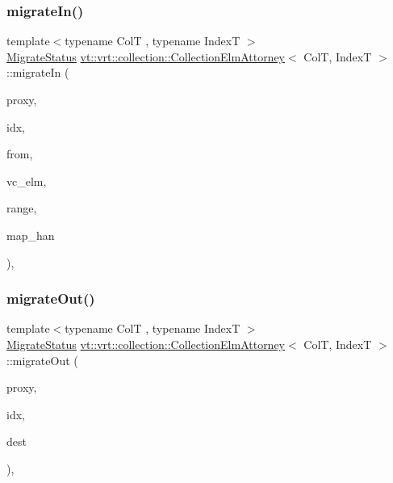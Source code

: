 \subsubsection{\texorpdfstring{migrate\+In()}{migrateIn()}}
{\footnotesize\ttfamily template$<$typename ColT , typename IndexT $>$ \\
\hyperlink{namespacevt_1_1vrt_1_1collection_ad221ad8aea9e586689b4335f5bcd9804}{Migrate\+Status} \hyperlink{structvt_1_1vrt_1_1collection_1_1_collection_elm_attorney}{vt\+::vrt\+::collection\+::\+Collection\+Elm\+Attorney}$<$ ColT, IndexT $>$\+::migrate\+In (\begin{DoxyParamCaption}\item[{\hyperlink{namespacevt_a1b417dd5d684f045bb58a0ede70045ac}{Virtual\+Proxy\+Type} const \&}]{proxy,  }\item[{IndexT const \&}]{idx,  }\item[{\hyperlink{namespacevt_a866da9d0efc19c0a1ce79e9e492f47e2}{Node\+Type} const \&}]{from,  }\item[{\hyperlink{structvt_1_1vrt_1_1collection_1_1_collection_elm_attorney_a36fe2c7f590baec1038c592db59a6315}{Virtual\+Ptr\+Type}}]{vc\+\_\+elm,  }\item[{IndexT const \&}]{range,  }\item[{\hyperlink{namespacevt_af64846b57dfcaf104da3ef6967917573}{Handler\+Type} const \&}]{map\+\_\+han }\end{DoxyParamCaption})\hspace{0.3cm}{\ttfamily [static]}, {\ttfamily [private]}}

\mbox{\label{structvt_1_1vrt_1_1collection_1_1_collection_elm_attorney_a672eb9e913410235692033f5b7ea24b5}} 
\subsubsection{\texorpdfstring{migrate\+Out()}{migrateOut()}}
{\footnotesize\ttfamily template$<$typename ColT , typename IndexT $>$ \\
\hyperlink{namespacevt_1_1vrt_1_1collection_ad221ad8aea9e586689b4335f5bcd9804}{Migrate\+Status} \hyperlink{structvt_1_1vrt_1_1collection_1_1_collection_elm_attorney}{vt\+::vrt\+::collection\+::\+Collection\+Elm\+Attorney}$<$ ColT, IndexT $>$\+::migrate\+Out (\begin{DoxyParamCaption}\item[{\hyperlink{namespacevt_a1b417dd5d684f045bb58a0ede70045ac}{Virtual\+Proxy\+Type} const \&}]{proxy,  }\item[{IndexT const \&}]{idx,  }\item[{\hyperlink{namespacevt_a866da9d0efc19c0a1ce79e9e492f47e2}{Node\+Type} const \&}]{dest }\end{DoxyParamCaption})\hspace{0.3cm}{\ttfamily [static]}, {\ttfamily [private]}}




